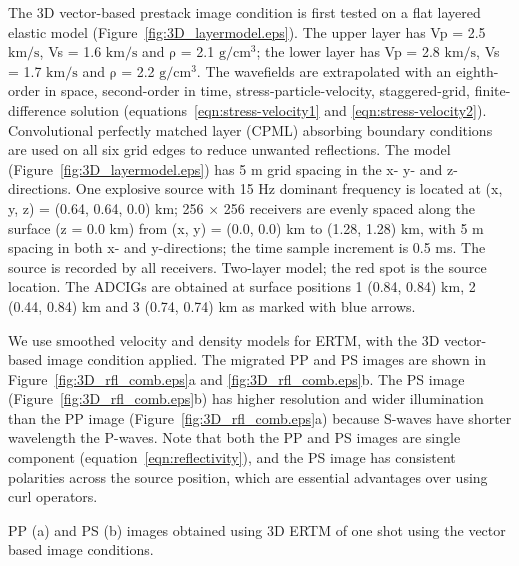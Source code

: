 \documentclass[manuscript,ulem,graphix,revised]{geophysics}
\begin{document}
The 3D vector-based prestack image condition is first tested on a flat layered elastic model (Figure~\ref{fig:3D_layermodel.eps}). The upper layer has Vp = 2.5 $\mathrm{km/s}$,  Vs = 1.6 $\mathrm{km/s}$ and  $\mathrm{\rho}$ = 2.1 $\mathrm{g/cm^3}$; the lower layer has  Vp = 2.8 $\mathrm{km/s}$,  Vs = 1.7 $\mathrm{km/s}$ and  $\mathrm{\rho}$ = 2.2 $\mathrm{g/cm^3}$.
The wavefields are extrapolated with an eighth-order in space, second-order in time, stress-particle-velocity, staggered-grid, finite-difference solution (equations~\ref{eqn:stress-velocity1} and \ref{eqn:stress-velocity2}). Convolutional perfectly matched layer (CPML) absorbing boundary conditions \citep{komatitsch07} are used on all six grid edges to reduce unwanted reflections.
The model (Figure~\ref{fig:3D_layermodel.eps}) has 5 m grid spacing in the x- y- and z-directions. One explosive source with 15 Hz dominant frequency is located at (x, y, z) = (0.64, 0.64, 0.0) km; 256 $\times$ 256 receivers are evenly spaced along the surface (z = 0.0 km) from  (x, y) = (0.0, 0.0) km to (1.28, 1.28) km, with 5 m spacing in both x- and y-directions; the time sample increment is 0.5 ms. The source is recorded by all receivers.
{
Two-layer model; the red spot is the source location. The ADCIGs are obtained at surface positions 1 (0.84, 0.84) km, 2 (0.44, 0.84) km and 3 (0.74, 0.74) km as marked with blue arrows. 
}

We use smoothed velocity and density models for ERTM, with the 3D vector-based image condition applied. The migrated PP and PS images are shown in Figure~\ref{fig:3D_rfl_comb.eps}a and \ref{fig:3D_rfl_comb.eps}b. The PS image (Figure~\ref{fig:3D_rfl_comb.eps}b) has higher resolution and wider illumination than the PP image (Figure~\ref{fig:3D_rfl_comb.eps}a) because S-waves have shorter wavelength the P-waves. Note that both the PP and PS images are single component (equation~\ref{eqn:reflectivity}), and the PS image has consistent polarities across the source position, which are essential advantages over using curl operators. 

{
PP (a) and PS (b) images obtained using 3D ERTM of one shot using the vector based image conditions.
}
\end{document}
